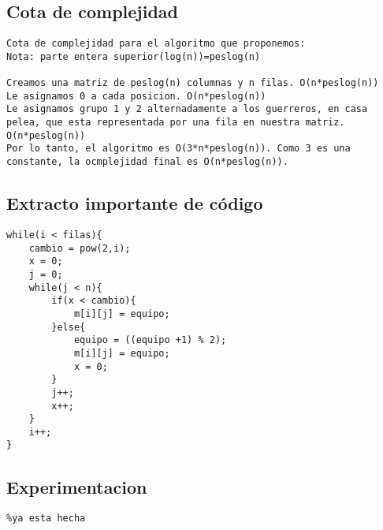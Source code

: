 \documentclass[10pt,a4paper]{article}
\begin{document}
\subsection{Cota de complejidad}
\begin{verbatim}
Cota de complejidad para el algoritmo que proponemos:
Nota: parte entera superior(log(n))=peslog(n)

Creamos una matriz de peslog(n) columnas y n filas. O(n*peslog(n))
Le asignamos 0 a cada posicion. O(n*peslog(n))
Le asignamos grupo 1 y 2 alternadamente a los guerreros, en casa pelea, que esta representada por una fila en nuestra matriz. O(n*peslog(n))
Por lo tanto, el algoritmo es O(3*n*peslog(n)). Como 3 es una constante, la ocmplejidad final es O(n*peslog(n)).
\end{verbatim}

\subsection{Extracto importante de código}
\begin{lstlisting}
while(i < filas){
	cambio = pow(2,i);
	x = 0;
	j = 0;
	while(j < n){
		if(x < cambio){
			m[i][j] = equipo;
		}else{
			equipo = ((equipo +1) % 2);
			m[i][j] = equipo;
			x = 0;
		}
		j++;
		x++;
	}
	i++;
}
\end{lstlisting}

\subsection{Experimentacion}
\begin{verbatim}
%ya esta hecha
\end{verbatim}
\end{document}
